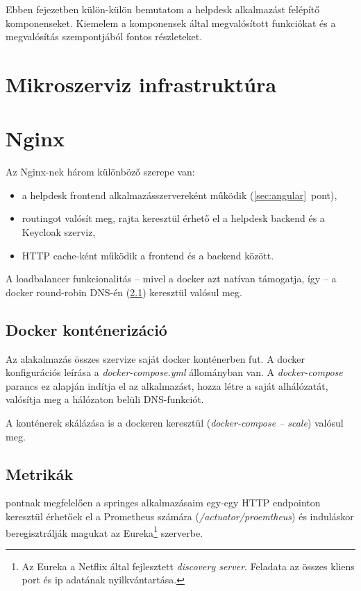 Ebben  fejezetben külön-külön bemutatom a helpdesk alkalmazást felépítő komponenseket. Kiemelem a komponensek által megvalósított funkciókat és a megvalósítás szempontjából fontos részleteket. 


\section{Mikroszerviz infrastruktúra}

\section{Nginx}\label{sec:nginx}
Az Nginx-nek három különböző szerepe van:

\begin{itemize}
	\item a \foreignlanguage{british}{helpdesk frontend} alkalmazásszervereként működik (\ref{sec:angular}~pont),
	
	\item \foreignlanguage{british}{routing}ot valósít meg, rajta keresztül érhető el a \foreignlanguage{british}{helpdesk backend} és a \foreignlanguage{british}{Keycloak} szerviz,
	
	\item \foreignlanguage{british}{HTTP cache}-ként működik a frontend és a backend között.
\end{itemize}

A loadbalancer funkcionalitás --  mivel a docker azt natívan támogatja, így --   a \foreignlanguage{british}{docker round-robin DNS}-én (\ref{sec:docker}) keresztül valósul meg.


\subsection{Docker konténerizáció}\label{sec:docker}
Az alakalmazás összes szervize saját docker konténerben fut. A docker konfigurációs leírása a \textit{docker-compose.yml} állományban van. A \textit{docker-compose} parancs ez alapján indítja el az alkalmazást, hozza létre a saját alhálózatát, valósítja meg a hálózaton belüli DNS-funkciót.

A konténerek skálázása is a dockeren keresztül (\textit{docker-compose --  scale}) valósul meg.


\subsection{Metrikák}\label{sec:metrikak}
 pontnak megfelelően a springes alkalmazásaim egy-egy HTTP endpointon keresztül érhetőek el a Prometheus számára (\textit{\mbox{/actuator/proemtheus}}) és induláskor beregisztrálják magukat az Eureka\footnote{Az Eureka a Netflix által fejlesztett \textit{discovery server}. Feladata az összes kliens port és ip adatának nyilkvántartása.} szerverbe.

